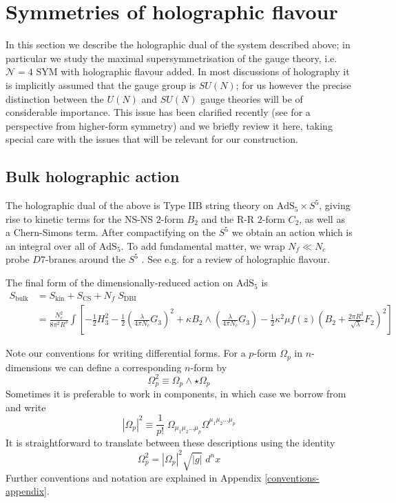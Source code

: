 \documentclass[aps,preprint,nofootinbib,preprintnumbers,eqsecnum,superscriptaddress]{revtex4}
\newcommand\sN{{\ensuremath{{\mathcal N}}}}
\begin{document}
 
\section{Symmetries of holographic flavour} \label{sec:symms} 
In this section we describe the holographic dual of the system described above; in particular we study the maximal supersymmetrisation of the gauge theory, i.e. $\sN = 4$ SYM with holographic flavour added. In most discussions of holography it is implicitly assumed that the gauge group is $SU(N)$; for us however the precise distinction between the $U(N)$ and $SU(N)$ gauge theories will be of considerable importance. This issue has been clarified recently (see \cite{Hofman:2017vwr} for a perspective from higher-form symmetry) and we briefly review it here, taking special care with the issues that will be relevant for our construction. 
\subsection{Bulk holographic action}
The holographic dual of the above is Type IIB string theory on $\text{AdS}_5 \times S^5$, giving rise to kinetic terms for the NS-NS $2$-form $B_2$ and the R-R $2$-form $C_2$, as well as a Chern-Simons term. After compactifying on the $S^5$ we obtain an action which is an integral over all of $\text{AdS}_5$. To add fundamental matter, we wrap $N_f \ll N_c$ probe $D7$-branes around the $S^5$ \cite{Karch:2002sh}. See e.g. \cite{CasalderreySolana:2011us} for a review of holographic flavour. 

The final form of the dimensionally-reduced action on $\text{AdS}_5$ is
\begin{equation}
	\begin{split} 
		S_{\text{bulk}}
		& = S_{\text{kin}} + S_{\text{CS}} + N_f \; S_{\text{DBI}} \\
		& =  \frac{N_c^2}{8 \pi^2 R^3}\int{\left[- \frac{1}{2} H_3^2 - \frac{1}{2}\left(\frac{\lambda}{4 \pi N_c}G_3 \right)^2 + \kappa B_2 \wedge \left(\frac{\lambda}{4 \pi N_c}G_3 \right) - \frac{1}{2} \kappa^2 \mu f(z)\left(B_2 + \frac{2 \pi R^2}{\sqrt{\lambda}} F_2 \right)^2 \right]} \label{bulkac} 
	\end{split}
\end{equation}

Note our conventions for writing differential forms. For a $p$-form $\Omega_p$ in $n$-dimensions we can define a corresponding $n$-form by
\begin{equation}
	\Omega_p^2 \equiv \Omega_p \wedge \star \Omega_p
\end{equation}
Sometimes it is preferable to work in components, in which case we borrow from \cite{Polchinski:1998rr} and write
\begin{equation}
	|\Omega_p|^2 \equiv \frac{1}{p!} \; \Omega_{\mu_1 \mu_2 \ldots \mu_p} \Omega^{\mu_1 \mu_2 \ldots \mu_p}
\end{equation}
It is straightforward to translate between these descriptions using the identity
\begin{equation}
	\Omega_p^2 = |\Omega_p|^2 \sqrt{|g|} \; d^n x
\end{equation}
Further conventions and notation are explained in Appendix \ref{conventions-appendix}. 
\end{document}
